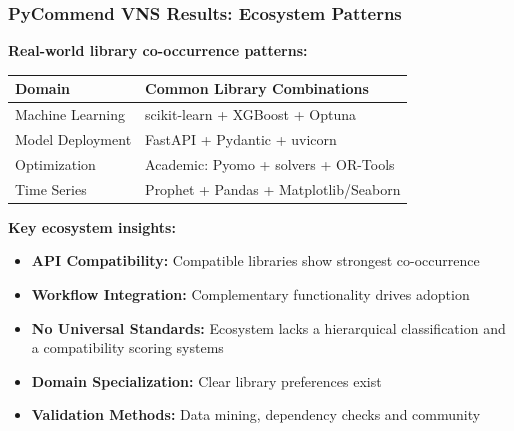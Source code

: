 \documentclass{beamer}
\begin{document}
\begin{frame}
\frametitle{PyCommend VNS Results: Ecosystem Patterns}

\textbf{Real-world library co-occurrence patterns:}
\vspace{0.1cm}
\begin{center}
\begin{tabular}{p{3.2cm}p{7cm}}
\toprule
\textbf{Domain} & \textbf{Common Library Combinations} \\
\midrule
Machine Learning & scikit-learn + XGBoost + Optuna \\
Model Deployment & FastAPI + Pydantic + uvicorn \\
Optimization & Academic: Pyomo + solvers + OR-Tools \\
Time Series & Prophet + Pandas + Matplotlib/Seaborn \\
\bottomrule
\end{tabular}
\end{center}

\small
\vspace{0.2cm}
\textbf{Key ecosystem insights:}
\begin{itemize}
\item \textbf{API Compatibility:} Compatible libraries show strongest co-occurrence
\item \textbf{Workflow Integration:} Complementary functionality drives adoption 
\item \textbf{No Universal Standards:} Ecosystem lacks a hierarquical classification and a compatibility scoring systems
\item \textbf{Domain Specialization:} Clear library preferences exist 
\item \textbf{Validation Methods:} Data mining, dependency checks and community 
\end{itemize}

\end{frame}
\end{document}
